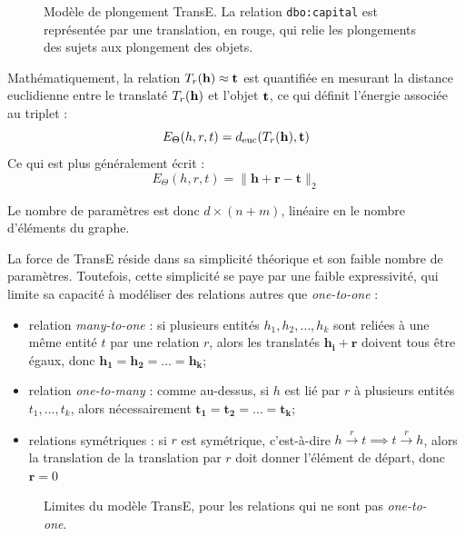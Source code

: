 \begin{figure}
    \centering
    
    \caption[Principe du modèle TransE]{Modèle de plongement TransE. La relation \texttt{dbo:capital} est représentée par une translation, en rouge, qui relie les plongements des sujets aux plongement des objets.}
    \label{fig:transe-intuition}
\end{figure}

Mathématiquement, la relation $T_r(\bf{h}) \approx \bf{t}$ est quantifiée en mesurant la distance euclidienne entre le translaté $T_r(\bf{h})$ et l'objet $\bf{t}$, ce qui définit l'énergie associée au triplet :
\begin{equation}
    E_\Theta(h, r, t) =  d_\text{euc}(T_r(\bf{h}), \bf{t})
    \label{eq:transe-mainvar}
\end{equation}
Ce qui est plus généralement écrit :
\begin{equation}
    E_\Theta(h, r, t) = \| \mathbf{h + r - t} \|_2
    \label{eq:transe-main}
\end{equation}

Le nombre de paramètres est donc $d \times (n + m)$, linéaire en le nombre d'éléments du graphe. 

La force de TransE réside dans sa simplicité théorique et son faible nombre de paramètres. Toutefois, cette simplicité se paye par une faible expressivité, qui limite sa capacité à modéliser des relations autres que \textit{one-to-one} :
\begin{itemize}
    \item relation \textit{many-to-one} : si plusieurs entités $h_1, h_2, \ldots, h_k$ sont reliées à une même entité $t$ par une relation $r$, alors les translatés $\mathbf{h_i + r}$ doivent tous être égaux, donc $\mathbf{h_1  = h_2 = \ldots = h_k}$;
    \item relation \textit{one-to-many} : comme au-dessus, si $h$ est lié par $r$ à plusieurs entités $t_1, \ldots, t_k$, alors nécessairement $\mathbf{t_1 = t_2 = \ldots = t_k}$;
    \item relations symétriques : si $r$ est symétrique, c'est-à-dire $h  \overset{r} \rightarrow t \implies t   \overset{r} \rightarrow h$, alors la translation de la translation par $r$ doit donner l'élément de départ, donc $\mathbf{r} = 0$
\end{itemize}

\begin{figure}[h]
    \centering
    
    \caption[Limites du modèle TransE]{Limites du modèle TransE, pour les relations qui ne sont pas \textit{one-to-one}.}
    \label{fig:transe-limitation}
\end{figure}


